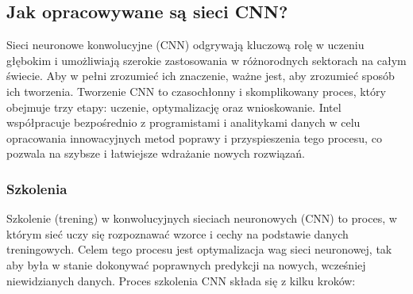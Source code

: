 \subsection{Jak opracowywane są sieci CNN?}
Sieci neuronowe konwolucyjne (CNN) odgrywają kluczową rolę w uczeniu głębokim i umożliwiają szerokie zastosowania w różnorodnych sektorach na całym świecie. Aby w pełni zrozumieć ich znaczenie, ważne jest, aby zrozumieć sposób ich tworzenia. Tworzenie CNN to czasochłonny i skomplikowany proces, który obejmuje trzy etapy: uczenie, optymalizację oraz wnioskowanie. Intel współpracuje bezpośrednio z programistami i analitykami danych w celu opracowania innowacyjnych metod poprawy i przyspieszenia tego procesu, co pozwala na szybsze i łatwiejsze wdrażanie nowych rozwiązań.
\subsubsection{Szkolenia}
Szkolenie (trening) w konwolucyjnych sieciach neuronowych (CNN) to proces, w którym sieć uczy się rozpoznawać wzorce i cechy na podstawie danych treningowych. Celem tego procesu jest optymalizacja wag sieci neuronowej, tak aby była w stanie dokonywać poprawnych predykcji na nowych, wcześniej niewidzianych danych. Proces szkolenia CNN składa się z kilku kroków:

